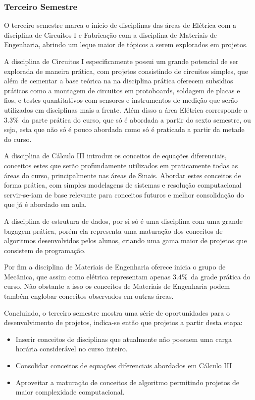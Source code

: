 \documentclass[12pt]{article} %
\begin{document}
\subsubsection{Terceiro Semestre}
O terceiro semestre marca o inicio de disciplinas das áreas de Elétrica com a disciplina de Circuitos I e Fabricação com a disciplina de Materiais de Engenharia, abrindo um leque maior de tópicos a serem explorados em projetos.

A disciplina de Circuitos I especificamente possui um grande potencial de ser explorada de maneira prática, com projetos consistindo de circuitos simples, que além de cementar a base teórica na na disciplina prática oferecem subsidios práticos como a montagem de circuitos em protoboards, soldagem de placas e fios, e testes quantitativos com sensores e instrumentos de medição que serão utilizados em disciplinas mais a frente. Além disso a área Elétrica corresponde a 3.3\%\ da parte prática do curso, que só é abordada a partir do sexto semestre, ou seja, esta que não só é pouco abordada como só é praticada a partir da metade do curso.

A disciplina de Cálculo III introduz os conceitos de equações diferenciais, conceitos estes que serão profundamente utilizados em praticamente todas as áreas do curso, principalmente nas áreas de Sinais. Abordar estes conceitos de forma prática, com simples modelagens de sistemas e resolução computacional servir-se-iam de base relevante para conceitos futuros e melhor consolidação do que já é abordado em aula.

A disciplina de estrutura de dados, por si só é uma disciplina com uma grande bagagem prática, porém ela representa uma maturação dos conceitos de algoritmos desenvolvidos pelos alunos, criando uma gama maior de projetos que consistem de programação.

Por fim a disciplina de Materiais de Engenharia oferece inicia o grupo de Mecânica, que assim como elétrica representam apenas 3.4\%\ da grade prática do curso. Não obstante a isso os conceitos de Materiais de Engenharia podem também englobar conceitos observados em outras áreas.

Concluindo, o terceiro semestre mostra uma série de oportunidades para o desenvolvimento de projetos, indica-se então que projetos a partir desta etapa:

\begin{itemize}
\item Inserir conceitos de disciplinas que atualmente não possuem uma carga horária considerável no curso inteiro.
\item Consolidar conceitos de equações diferenciais abordados em Cálculo III
\item Aproveitar a maturação de conceitos de algoritmo permitindo projetos de maior complexidade computacional. 
\end{itemize}
\end{document}
